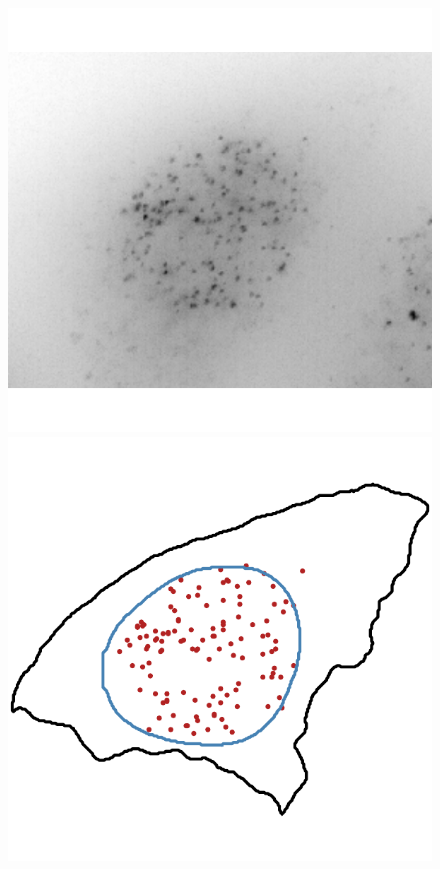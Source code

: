 \begin{figure}[]
		\includegraphics[width=0.95\linewidth]{figures/introduction/real_image_intranuclear}
		\vfill
		\includegraphics[width=0.95\linewidth]{figures/introduction/real_coord_intranuclear}
	\endminipage\hfill

\end{figure}
